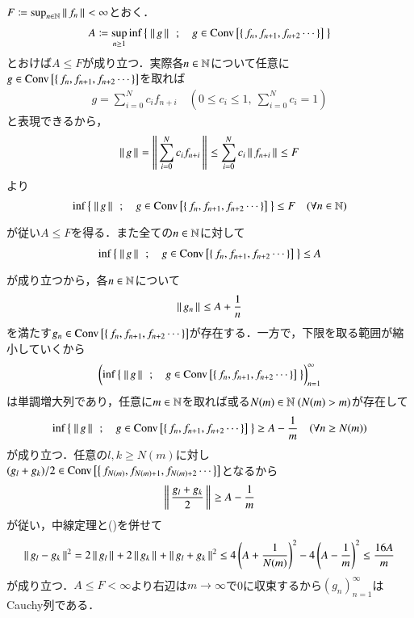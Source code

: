 \begin{prf}
	$F \coloneqq \operatorname*{sup}_{n \in \mathbb{N}} \left\|\, f_n\, \right\|_{} < \infty$とおく．
	\begin{align}
		A \coloneqq \operatorname*{sup}_{n \geq 1} \operatorname*{inf}_{} \left\{\ \left\|\, g\, \right\|_{}\ \, ; \quad g \in \mathrm{Conv}\left[\left\{\, f_n,f_{n+1},f_{n+2} \cdots \, \right\}\right]\ \right\}
	\end{align}
	とおけば$A \leq F$が成り立つ．実際各$n \in \mathbb{N}$について任意に$g \in \mathrm{Conv}\left[\left\{\, f_n,f_{n+1},f_{n+2} \cdots \, \right\}\right]$を取れば
	\begin{align}
		g = \sum_{i=0}^{N}c_i f_{n+i} \quad \left( 0 \leq c_i \leq 1,\ \mbox{$\sum_{i=0}^{N} c_i = 1$} \right)
	\end{align}
	と表現できるから，
	\begin{align}
		\left\|\, g\, \right\|_{} = \left\|\, \sum_{i=0}^{N}c_i f_{n+i}\, \right\|_{} \leq \sum_{i=0}^{N}c_i \left\|\, f_{n+i}\, \right\|_{} \leq F
	\end{align}
	より
	\begin{align}
		\operatorname*{inf}_{} \left\{\ \left\|\, g\, \right\|_{}\ \, ; \quad g \in \mathrm{Conv}\left[\left\{\, f_n,f_{n+1},f_{n+2} \cdots \, \right\}\right]\ \right\} \leq F \quad (\forall n \in \mathbb{N})
	\end{align}
	が従い$A \leq F$を得る．また全ての$n \in \mathbb{N}$に対して
	\begin{align}
		\operatorname*{inf}_{} \left\{\ \left\|\, g\, \right\|_{}\ \, ; \quad g \in \mathrm{Conv}\left[\left\{\, f_n,f_{n+1},f_{n+2} \cdots \, \right\}\right]\ \right\} \leq A
	\end{align}
	が成り立つから，各$n \in \mathbb{N}$について
	\begin{align}
		\left\|\, g_n\, \right\|_{} \leq A + \frac{1}{n} \label{eq:thm_kolmos_1}
	\end{align}
	を満たす$g_n \in \mathrm{Conv}\left[\left\{\, f_n,f_{n+1},f_{n+2} \cdots \, \right\}\right]$が存在する．一方で，下限を取る範囲が縮小していくから
	\begin{align}
		\left( \operatorname*{inf}_{} \left\{\ \left\|\, g\, \right\|_{}\ \, ; \quad g \in \mathrm{Conv}\left[\left\{\, f_n,f_{n+1},f_{n+2} \cdots \, \right\}\right]\ \right\} \right)_{n=1}^\infty
	\end{align}
	は単調増大列であり，任意に$m \in \mathbb{N}$を取れば或る$N(m) \in \mathbb{N}\ (N(m) > m)$が存在して
	\begin{align}
		\operatorname*{inf}_{} \left\{\ \left\|\, g\, \right\|_{}\ \, ; \quad g \in \mathrm{Conv}\left[\left\{\, f_n,f_{n+1},f_{n+2} \cdots \, \right\}\right]\ \right\} \geq A - \frac{1}{m}
		\quad (\forall n \geq N(m))
	\end{align}
	が成り立つ．任意の$l,k \geq N(m)$に対し$(g_l + g_k) / 2 \in \mathrm{Conv}\left[\left\{\, f_{N(m)},f_{N(m)+1},f_{N(m)+2} \cdots \, \right\}\right]$となるから
	\begin{align}
		\left\|\, \frac{g_l + g_k}{2}\, \right\|_{} \geq A - \frac{1}{m}
	\end{align}
	が従い，中線定理と()を併せて
	\begin{align}
		\left\|\, g_l - g_k\, \right\|_{}^2 = 2\left\|\, g_l\, \right\|_{} + 2\left\|\, g_k\, \right\|_{} + \left\|\, g_l + g_k\, \right\|_{}^2 \leq 4\left( A + \frac{1}{N(m)} \right)^2 - 4\left( A - \frac{1}{m} \right)^2 \leq \frac{16A}{m}
	\end{align}
	が成り立つ．$A \leq F < \infty$より右辺は$m \longrightarrow \infty$で0に収束するから$(g_n)_{n=1}^{\infty}$はCauchy列である．
	\QED
\end{prf}